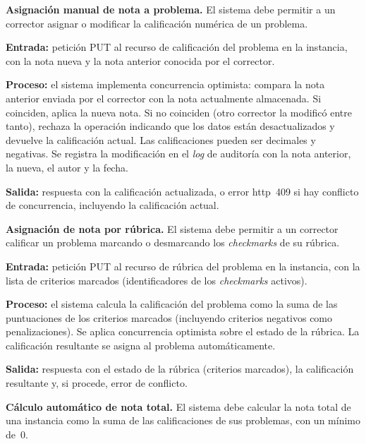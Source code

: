 \begin{functional}

    \item \textbf{Asignación manual de nota a problema.} \label{rf:grading:manual}
    El sistema debe permitir a un corrector asignar o modificar la calificación numérica de
    un problema.

    \textbf{Entrada:} petición PUT al recurso de calificación del problema en la instancia,
    con la nota nueva y la nota anterior conocida por el corrector.

    \textbf{Proceso:} el sistema implementa concurrencia optimista: compara la nota anterior
    enviada por el corrector con la nota actualmente almacenada. Si coinciden, aplica la
    nueva nota. Si no coinciden (otro corrector la modificó entre tanto), rechaza la
    operación indicando que los datos están desactualizados y devuelve la calificación
    actual. Las calificaciones pueden ser decimales y negativas. Se registra la modificación
    en el \textit{log} de auditoría con la nota anterior, la nueva, el autor y la fecha.

    \textbf{Salida:} respuesta con la calificación actualizada, o error \acs{http}~409 si
    hay conflicto de concurrencia, incluyendo la calificación actual.

    \item \textbf{Asignación de nota por rúbrica.} \label{rf:grading:rubric}
    El sistema debe permitir a un corrector calificar un problema marcando o desmarcando los
    \textit{checkmarks} de su rúbrica.

    \textbf{Entrada:} petición PUT al recurso de rúbrica del problema en la instancia, con
    la lista de criterios marcados (identificadores de los \textit{checkmarks} activos).

    \textbf{Proceso:} el sistema calcula la calificación del problema como la suma de las
    puntuaciones de los criterios marcados (incluyendo criterios negativos como
    penalizaciones). Se aplica concurrencia optimista sobre el estado de la rúbrica. La
    calificación resultante se asigna al problema automáticamente.

    \textbf{Salida:} respuesta con el estado de la rúbrica (criterios marcados), la
    calificación resultante y, si procede, error de conflicto.

    \item \textbf{Cálculo automático de nota total.} \label{rf:grading:total}
    El sistema debe calcular la nota total de una instancia como la suma de las
    calificaciones de sus problemas, con un mínimo de~0.


\end{functional}
